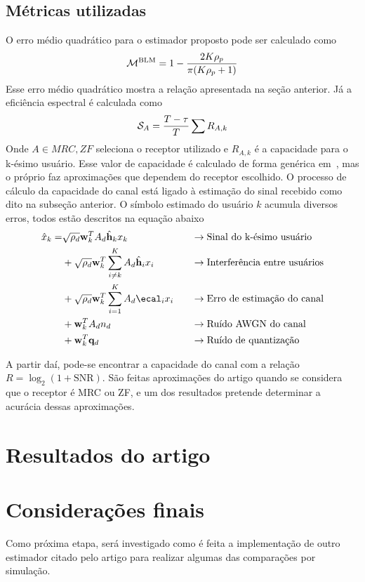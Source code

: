\documentclass{article}
\begin{document}
	\subsection{Métricas utilizadas}

	O erro médio quadrático para o estimador proposto pode ser calculado como 
	\begin{equation}
		\mathcal{M}^{\text{BLM}} = 1 - \frac{2K\rho_p}{\pi(K\rho_p+1)}
		\label{eq:erro_medio_quadratico_estimador_proposto}
	\end{equation}
	Esse erro médio quadrático mostra a relação apresentada na seção anterior. Já a eficiência espectral é calculada como
	\begin{equation}
		\mathcal{S}_{A} = \frac{T-\tau}{T}\sum{R_{A,k}}
		\label{eq:eficiencia_espectral_estimador_receptor_proposto}
	\end{equation}
	Onde $A\in{MRC,ZF}$ seleciona o receptor utilizado e $R_{A,k}$ é a capacidade para o k-ésimo usuário. Esse valor de capacidade é calculado de forma genérica em~\cite[eq. 42]{li.etal_2017a}, mas o próprio faz aproximações que dependem do receptor escolhido. O processo de cálculo da capacidade do canal está ligado à estimação do sinal recebido como dito na subseção anterior. O símbolo estimado do usuário $k$ acumula diversos erros, todos estão descritos na equação abaixo
	\begin{alignat*}{3}
		\xh_k  = & \sqrt{\rho_d}\wbf^T_k A_d \hbfh_{k} x_k &\;\;\;& \to\text{Sinal do k-ésimo usuário} \\
		& + \sqrt{\rho_d}\wbf^T_k\sum^{K}_{i\neq k}A_d\hbfh_ix_i &\;\;\;& \to\text{Interferência entre usuários} \\
		& + \sqrt{\rho_d}\wbf^T_k\sum^K_{i=1}A_d\ecal_ix_i &\;\;\;& \to\text{Erro de estimação do canal} \\ 
		& + \wbf^T_kA_dn_d &\;\;\;& \to\text{Ruído AWGN do canal} \\ 
		& + \wbf^T_k \qbf_d &\;\;\;& \to\text{Ruído de quantização}
	\end{alignat*}
	\label{eq:}

	A partir daí, pode-se encontrar a capacidade do canal com a relação $R=\log_2(1+\text{SNR})$. São feitas aproximações do artigo quando se considera que o receptor é MRC ou ZF, e um dos resultados pretende determinar a acurácia dessas aproximações. 

	\section{Resultados do artigo}
	\label{sec:resultados_do_artigo}

	

	\section{Considerações finais}
	\label{sec:conclusao}

	Como próxima etapa, será investigado como é feita a implementação de outro estimador citado pelo artigo para realizar algumas das comparações por simulação. 

	
	
\end{document}
